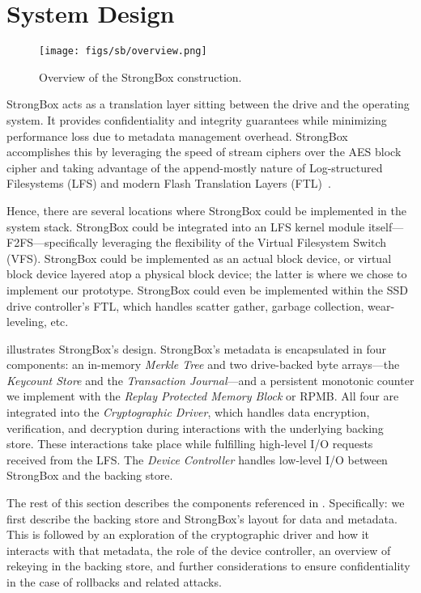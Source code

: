 \section{System Design} \label{sec:sb-design}

\begin{figure}[t]
  \centering
   \texttt{[image: figs/sb/overview.png]}
    \caption{Overview of the StrongBox construction.} \label{fig:sb-overview}
 \end{figure}

StrongBox acts as a translation layer sitting between the drive and the
operating system. It provides confidentiality and integrity guarantees while
minimizing performance loss due to metadata management overhead. StrongBox
accomplishes this by leveraging the speed of stream ciphers over the AES block
cipher and taking advantage of the append-mostly nature of Log-structured
Filesystems (LFS) and modern Flash Translation Layers (FTL)~\cite{SSD}.

Hence, there are several locations where StrongBox could be implemented in the
system stack. StrongBox could be integrated into an LFS kernel module
itself---\eg F2FS---specifically leveraging the flexibility of the Virtual
Filesystem Switch (VFS). StrongBox could be implemented as an actual block
device, or virtual block device layered atop a physical block device; the latter
is where we chose to implement our prototype. StrongBox could even be
implemented within the SSD drive controller's FTL, which handles scatter gather,
garbage collection, wear-leveling, etc.

 illustrates StrongBox's design. StrongBox's metadata is
encapsulated in four components: an in-memory \emph{Merkle Tree} and two
drive-backed byte arrays---the \emph{Keycount Store} and the \emph{Transaction
Journal}---and a persistent monotonic counter we implement with the \emph{Replay
Protected Memory Block} or RPMB. All four are integrated into the
\emph{Cryptographic Driver}, which handles data encryption, verification, and
decryption during interactions with the underlying backing store. These
interactions take place while fulfilling high-level I/O requests received from
the LFS. The \emph{Device Controller} handles low-level I/O between
StrongBox and the backing store.

The rest of this section describes the components referenced in
. Specifically: we first describe the backing store and
StrongBox's layout for data and metadata. This is followed by an exploration of
the cryptographic driver and how it interacts with that metadata, the role of
the device controller, an overview of rekeying in the backing store, and further
considerations to ensure confidentiality in the case of rollbacks and related
attacks.

